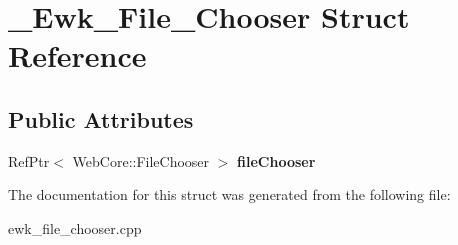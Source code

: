 \hypertarget{struct__Ewk__File__Chooser}{\section{\+\_\+\+Ewk\+\_\+\+File\+\_\+\+Chooser Struct Reference}
\label{struct__Ewk__File__Chooser}
}
\subsection*{Public Attributes}
\begin{DoxyCompactItemize}
\item 
\hypertarget{struct__Ewk__File__Chooser_adf582285be28d33010662398084ce715}{Ref\+Ptr$<$ Web\+Core\+::\+File\+Chooser $>$ {\bfseries file\+Chooser}}\label{struct__Ewk__File__Chooser_adf582285be28d33010662398084ce715}

\end{DoxyCompactItemize}


The documentation for this struct was generated from the following file\+:\begin{DoxyCompactItemize}
\item 
ewk\+\_\+file\+\_\+chooser.\+cpp\end{DoxyCompactItemize}
